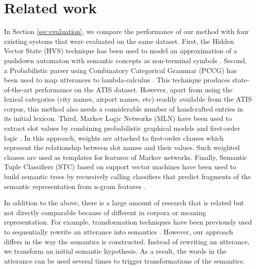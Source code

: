 \documentclass{article}
\begin{document}
\section{Related work}

In Section \ref{sec:evaluation}, we compare the performance of our method with four existing systems that were evaluated on the same dataset. 
First, the Hidden Vector State (HVS) technique has been used to model an approximation of a pushdown automaton with semantic concepts as non-terminal symbols \cite{he05,jurcicek08}. 
Second, a Probabilistic parser using Combinatory Categorical Grammar   (PCCG) has been used to map utterances to lambda-calculus \cite{zettlemoyer07}. 
This technique produces state-of-the-art performance on the ATIS dataset. However, apart from using the lexical categories (city names, airport names, etc) readily available from the ATIS corpus, this method also needs a considerable number of handcrafted entries in its initial lexicon. 
Third, Markov Logic Networks (MLN) have been used to extract slot values by combining probabilistic graphical models and first-order logic \cite{meza08b}. In this approach, weights are attached to first-order clauses which represent the relationship between slot names and their values. Such weighted clauses are used as templates for features of Markov networks.
Finally, Semantic Tuple Classifiers (STC) based on support vector machines have been used to build semantic trees by recursively calling classifiers that predict fragments of the semantic representation from n-gram features \cite{mairesse09}.

In addition to the above, there is a large amount of research that is related but not directly comparable because of different in corpora or meaning representation. 
For example, transformation techniques have been previously used to sequentially rewrite an utterance into semantics \cite{kate05}. However, our approach differs in the way the semantics is constructed. Instead of rewriting an utterance, we transform an initial semantic hypothesis. As a result, the words in the utterance can be used several times to trigger transformations of the semantics. 
\end{document}
